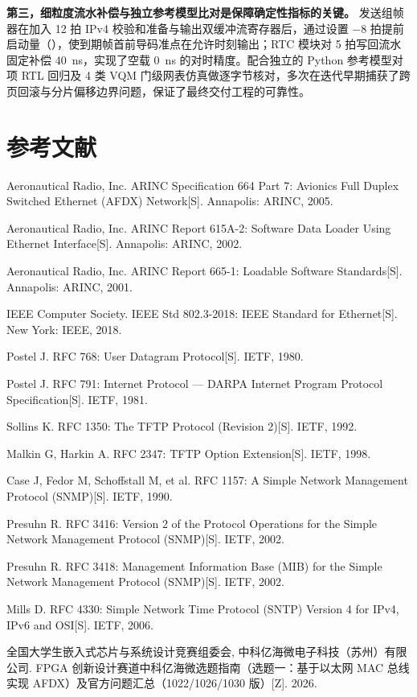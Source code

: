 \textbf{第三，细粒度流水补偿与独立参考模型比对是保障确定性指标的关键。}
发送组帧器在加入 12 拍 IPv4 校验和准备与输出双缓冲流寄存器后，通过设置 $-8$ 拍提前启动量（），使到期帧首前导码准点在允许时刻输出；RTC 模块对 5 拍写回流水固定补偿 40~ns，实现了空载 0~ns 的对时精度。配合独立的 Python 参考模型对 \RegCount{} 项 RTL 回归及 4 类 VQM 门级网表仿真做逐字节核对，多次在迭代早期捕获了跨页回滚与分片偏移边界问题，保证了最终交付工程的可靠性。

\section{参考文献}

\begingroup
\small\linespread{1.12}\selectfont
\begin{enumerate}[label={[\arabic*]},leftmargin=2.4em,itemsep=2pt,topsep=4pt]
  \item Aeronautical Radio, Inc. ARINC Specification 664 Part 7: Avionics Full Duplex Switched Ethernet (AFDX) Network[S]. Annapolis: ARINC, 2005.
  \item Aeronautical Radio, Inc. ARINC Report 615A-2: Software Data Loader Using Ethernet Interface[S]. Annapolis: ARINC, 2002.
  \item Aeronautical Radio, Inc. ARINC Report 665-1: Loadable Software Standards[S]. Annapolis: ARINC, 2001.
  \item IEEE Computer Society. IEEE Std 802.3-2018: IEEE Standard for Ethernet[S]. New York: IEEE, 2018.
  \item Postel J. RFC 768: User Datagram Protocol[S]. IETF, 1980.
  \item Postel J. RFC 791: Internet Protocol — DARPA Internet Program Protocol Specification[S]. IETF, 1981.
  \item Sollins K. RFC 1350: The TFTP Protocol (Revision 2)[S]. IETF, 1992.
  \item Malkin G, Harkin A. RFC 2347: TFTP Option Extension[S]. IETF, 1998.
  \item Case J, Fedor M, Schoffstall M, et al. RFC 1157: A Simple Network Management Protocol (SNMP)[S]. IETF, 1990.
  \item Presuhn R. RFC 3416: Version 2 of the Protocol Operations for the Simple Network Management Protocol (SNMP)[S]. IETF, 2002.
  \item Presuhn R. RFC 3418: Management Information Base (MIB) for the Simple Network Management Protocol (SNMP)[S]. IETF, 2002.
  \item Mills D. RFC 4330: Simple Network Time Protocol (SNTP) Version 4 for IPv4, IPv6 and OSI[S]. IETF, 2006.
  \item 全国大学生嵌入式芯片与系统设计竞赛组委会, 中科亿海微电子科技（苏州）有限公司. FPGA 创新设计赛道中科亿海微选题指南（选题一：基于以太网 MAC 总线实现 AFDX）及官方问题汇总（1022/1026/1030 版）[Z]. 2026.
\end{enumerate}
\endgroup
